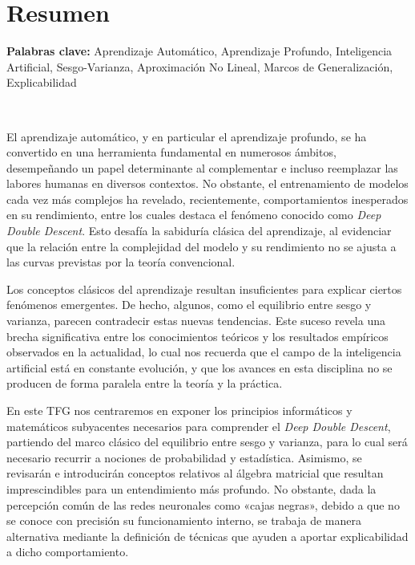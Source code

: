 %

\chapter{Resumen}

\noindent\textbf{Palabras clave:} Aprendizaje Automático, Aprendizaje Profundo, Inteligencia Artificial, Sesgo-Varianza, Aproximación No Lineal, Marcos de Generalización, Explicabilidad

\

El aprendizaje automático, y en particular el aprendizaje profundo, se ha convertido en una herramienta fundamental en numerosos ámbitos, desempeñando un papel determinante al complementar e incluso reemplazar las labores humanas en diversos contextos. No obstante, el entrenamiento de modelos cada vez más complejos ha revelado, recientemente, comportamientos inesperados en su rendimiento, entre los cuales destaca el fenómeno conocido como \emph{Deep Double Descent}. Esto desafía la sabiduría clásica del aprendizaje, al evidenciar que la relación entre la complejidad del modelo y su rendimiento no se ajusta a las curvas previstas por la teoría convencional.

Los conceptos clásicos del aprendizaje resultan insuficientes para explicar ciertos fenómenos emergentes. De hecho, algunos, como el equilibrio entre sesgo y varianza, parecen contradecir estas nuevas tendencias. Este suceso revela una brecha significativa entre los conocimientos teóricos y los resultados empíricos observados en la actualidad, lo cual nos recuerda que el campo de la inteligencia artificial está en constante evolución, y que los avances en esta disciplina no se producen de forma paralela entre la teoría y la práctica.

En este TFG nos centraremos en exponer los principios informáticos y matemáticos subyacentes necesarios para comprender el \emph{Deep Double Descent}, partiendo del marco clásico del equilibrio entre sesgo y varianza, para lo cual será necesario recurrir a nociones de probabilidad y estadística. Asimismo, se revisarán e introducirán conceptos relativos al álgebra matricial que resultan imprescindibles para un entendimiento más profundo. No obstante, dada la percepción común de las redes neuronales como «cajas negras», debido a que no se conoce con precisión su funcionamiento interno, se trabaja de manera alternativa mediante la definición de técnicas que ayuden a aportar explicabilidad a dicho comportamiento.

